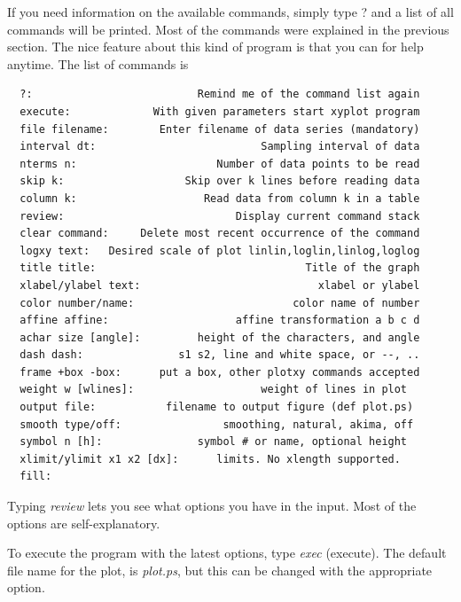 \documentclass{article}
\begin{document}
If you need information on the available commands, simply type ? and a list of all commands will be printed. Most of the commands were explained in the previous section. The nice feature about this kind of program is that you can for help anytime. The list of commands is
\begin{verbatim}
  ?:                          Remind me of the command list again
  execute:             With given parameters start xyplot program
  file filename:        Enter filename of data series (mandatory)
  interval dt:                          Sampling interval of data
  nterms n:                      Number of data points to be read
  skip k:                   Skip over k lines before reading data
  column k:                    Read data from column k in a table
  review:                           Display current command stack
  clear command:     Delete most recent occurrence of the command
  logxy text:   Desired scale of plot linlin,loglin,linlog,loglog
  title title:                                 Title of the graph
  xlabel/ylabel text:                            xlabel or ylabel
  color number/name:                         color name of number
  affine affine:                    affine transformation a b c d
  achar size [angle]:         height of the characters, and angle
  dash dash:               s1 s2, line and white space, or --, ..
  frame +box -box:      put a box, other plotxy commands accepted
  weight w [wlines]:                    weight of lines in plot  
  output file:           filename to output figure (def plot.ps) 
  smooth type/off:                smoothing, natural, akima, off 
  symbol n [h]:               symbol # or name, optional height  
  xlimit/ylimit x1 x2 [dx]:      limits. No xlength supported.   
  fill:   
\end{verbatim}
Typing {\it review} lets you see what options you have in the input. Most of the options are self-explanatory. 

To execute the program with the latest options, type {\it exec} (execute). The default file name for the plot, is {\it plot.ps}, but this can be changed with the appropriate option.
\end{document}
